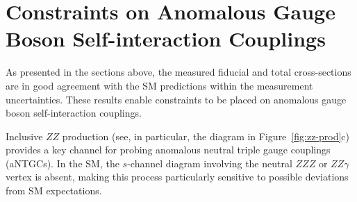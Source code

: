 





\section{Constraints on Anomalous Gauge Boson Self-interaction Couplings}
\label{subsec:anom_couplings}

As presented in the sections above, the measured fiducial and total cross-sections are in good agreement with the SM predictions within the measurement uncertainties. These results enable constraints to be placed on anomalous gauge boson self-interaction couplings.

Inclusive $ZZ$ production (see, in particular, the diagram in Figure~\ref{fig:zz-prod}c) provides a key channel for probing anomalous neutral triple gauge couplings (aNTGCs). In the SM, the $s$-channel diagram involving the neutral $ZZZ$ or $ZZ\gamma$ vertex is absent, making this process particularly sensitive to possible deviations from SM expectations.

